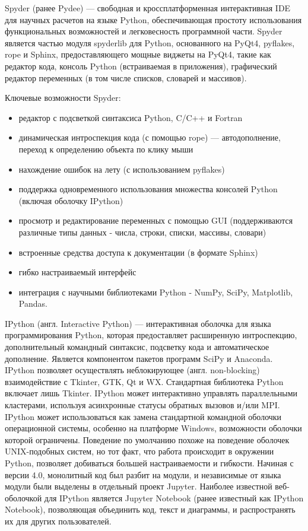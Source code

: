 Spyder (ранее Pydee) — свободная и кроссплатформенная интерактивная IDE для научных расчетов на языке Python, обеспечивающая простоту использования функциональных возможностей и легковесность программной части. Spyder является частью модуля spyderlib для Python, основанного на PyQt4, pyflakes, rope и Sphinx, предоставляющего мощные виджеты на PyQt4, такие как редактор кода, консоль Python (встраиваемая в приложения), графический редактор переменных (в том числе списков, словарей и массивов).

Ключевые возможности Spyder:
\begin{itemize}
	\item редактор с подсветкой синтаксиса Python, C/C++ и Fortran
	\item динамическая интроспекция кода (с помощью rope) — автодополнение, переход к определению объекта по клику мыши
	\item нахождение ошибок на лету (с использованием pyflakes)
	\item поддержка одновременного использования множества консолей Python (включая оболочку IPython)
	\item просмотр и редактирование переменных с помощью GUI (поддерживаются различные типы данных - числа, строки, списки, массивы, словари)
	\item встроенные средства доступа к документации (в формате Sphinx)
	\item гибко настраиваемый интерфейс
	\item интеграция с научными библиотеками Python - NumPy, SciPy, Matplotlib, Pandas.
\end{itemize}

IPython (англ. Interactive Python) — интерактивная оболочка для языка программирования Python, которая предоставляет расширенную интроспекцию, дополнительный командный синтаксис, подсветку кода и автоматическое дополнение. Является компонентом пакетов программ SciPy и Anaconda. IPython позволяет осуществлять неблокирующее (англ. non-blocking) взаимодействие с Tkinter, GTK, Qt и WX. Стандартная библиотека Python включает лишь Tkinter. IPython может интерактивно управлять параллельными кластерами, используя асинхронные статусы обратных вызовов и/или MPI. IPython может использоваться как замена стандартной командной оболочки операционной системы, особенно на платформе Windows, возможности оболочки которой ограничены. Поведение по умолчанию похоже на поведение оболочек UNIX-подобных систем, но тот факт, что работа происходит в окружении Python, позволяет добиваться большей настраиваемости и гибкости.
Начиная с версии 4.0, монолитный код был разбит на модули, и независимые от языка модули были выделены в отдельный проект Jupyter. Наиболее известной веб-оболочкой для IPython является Jupyter Notebook (ранее известный как IPython Notebook), позволяющая объединить код, текст и диаграммы, и распространять их для других пользователей.

